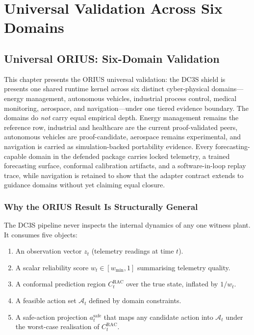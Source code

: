 \chapter{Universal Validation Across Six Domains}
\label{ch:ch07_universal_validation}
\label{ch:universal-validation}


\section{Universal ORIUS: Six-Domain Validation}
\label{ch:battery-to-orius}

This chapter presents the ORIUS universal validation: the DC3S shield is
presents one shared runtime kernel across six distinct cyber-physical
domains---energy management, autonomous vehicles, industrial process control,
medical monitoring, aerospace, and navigation---under one tiered evidence
boundary.  The domains do \emph{not} carry equal empirical depth.  Energy
management remains the reference row, industrial and healthcare are the
current proof-validated peers, autonomous vehicles are proof-candidate,
aerospace remains experimental, and navigation is carried as
simulation-backed portability evidence.  Every forecasting-capable domain in
the defended package carries locked telemetry, a trained forecasting surface,
conformal calibration artifacts, and a software-in-loop replay trace, while
navigation is retained to show that the adapter contract extends to guidance
domains without yet claiming equal closure.

\subsection{Why the ORIUS Result Is Structurally General}

The DC3S pipeline never inspects the internal dynamics of any one witness
plant.  It consumes five objects:

\begin{enumerate}
  \item An observation vector $z_t$ (telemetry readings at time $t$).
  \item A scalar reliability score $w_t \in [w_{\min}, 1]$ summarising
    telemetry quality.
  \item A conformal prediction region $C_t^{\text{RAC}}$ over the true state,
    inflated by $1/w_t$.
  \item A feasible action set $\mathcal{A}_t$ defined by domain constraints.
  \item A safe-action projection $a_t^{\text{safe}}$ that maps any candidate
    action into $\mathcal{A}_t$ under the worst-case realisation of
    $C_t^{\text{RAC}}$.
\end{enumerate}

